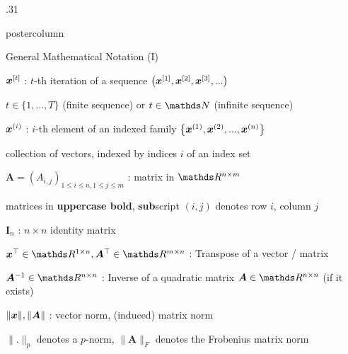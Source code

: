 \documentclass[11pt,compress,t,notes=noshow, xcolor=table]{beamer}
\begin{document}
\begin{frame}[fragile]{}
\begin{columns}
\begin{column}{.31\textwidth}
\begin{beamercolorbox}[center]{postercolumn}
\begin{minipage}{.98\textwidth}
{\begin{myblock}{General Mathematical Notation (I)}
						\begin{codebox}
						    $\bm{x}^{[t]}$ :  $t$-th iteration of a sequence $\left(\bm{x}^{[1]}, \bm{x}^{[2]}, \bm{x}^{[3]}, ...\right)$
						\end{codebox}
						\hspace*{1ex} $t \in \{1, ..., T\}$ (finite sequence) or $t \in \N$ (infinite sequence)
						\\
						\begin{codebox}
						    $\bm{x}^{(i)}$ :  $i$-th element of an indexed family $\left\{\bm{x}^{(1)}, \bm{x}^{(2)}, ..., \bm{x}^{(n)}\right\}$
						\end{codebox}
						\hspace*{1ex} collection of vectors, indexed by indices $i$ of an index set\\
						\begin{codebox}
						    $\bm{A} = \left(A_{i,j}\right)_{1\le i \le n, 1 \le j \le m}$ :  matrix in $\R^{n \times m} $
						\end{codebox}
						\hspace*{1ex} matrices in \textbf{uppercase bold}, \textbf{sub}script $(i,j)$ denotes row $i$, column $j$
						\\
						\begin{codebox}
							$\mathbf{I}_n$ : $n \times n$ identity matrix
						\end{codebox}
						\hspace*{1ex} %
						\begin{codebox}
						    $\xv^\top \in \R^{1 \times n}, \bm{A}^\top \in \R^{m \times n}$ :  Transpose of a vector / matrix
						\end{codebox}
						\hspace*{1ex}
						\begin{codebox}
						    $\bm{A}^{-1} \in \R^{n \times n}$ :  Inverse of a quadratic matrix $\bm{A} \in \R^{n \times n}$ (if it exists)
						\end{codebox}
						\hspace*{1ex}
						\begin{codebox}
						    $\|\bm{x}\|, \|\bm{A}\|$ : vector norm, (induced) matrix norm
						\end{codebox}
						\hspace*{1ex} %
						$\|.\|_p$ denotes a $p$-norm, $\|\bm{A}\|_F$ denotes the Frobenius matrix norm

\end{myblock}}
\end{minipage}
\end{beamercolorbox}
\end{column}
\end{columns}
\end{frame}
\end{document}
